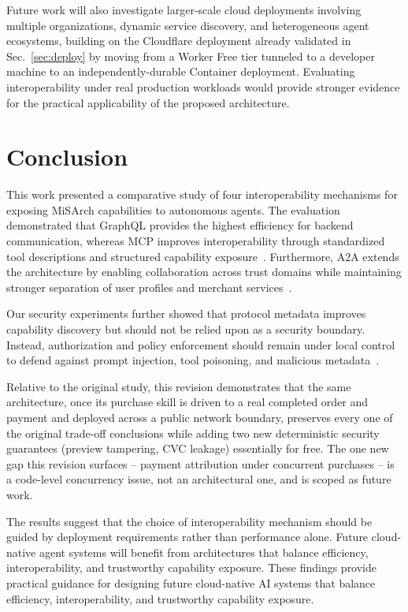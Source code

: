 \documentclass[conference]{IEEEtran}
\begin{document}
Future work will also investigate larger-scale cloud deployments involving
multiple organizations, dynamic service discovery, and heterogeneous agent
ecosystems, building on the Cloudflare deployment already validated in
Sec.~\ref{sec:deploy} by moving from a Worker Free tier tunneled to a
developer machine to an independently-durable Container deployment.
Evaluating interoperability under real production workloads would provide
stronger evidence for the practical applicability of the proposed
architecture.

\section{Conclusion}

This work presented a comparative study of four interoperability mechanisms
for exposing MiSArch capabilities to autonomous agents. The evaluation
demonstrated that GraphQL provides the highest efficiency for backend
communication, whereas MCP improves interoperability through standardized
tool descriptions and structured capability exposure~\cite{ref2,ref9}.
Furthermore, A2A extends the architecture by enabling collaboration across
trust domains while maintaining stronger separation of user profiles and
merchant services~\cite{ref3}.

Our security experiments further showed that protocol metadata improves
capability discovery but should not be relied upon as a security boundary.
Instead, authorization and policy enforcement should remain under local
control to defend against prompt injection, tool poisoning, and malicious
metadata~\cite{ref5,ref6}.

Relative to the original study, this revision demonstrates that the same
architecture, once its purchase skill is driven to a real completed order
and payment and deployed across a public network boundary, preserves every
one of the original trade-off conclusions while adding two new deterministic
security guarantees (preview tampering, CVC leakage) essentially for free.
The one new gap this revision surfaces -- payment attribution under
concurrent purchases -- is a code-level concurrency issue, not an
architectural one, and is scoped as future work.

The results suggest that the choice of interoperability mechanism should be
guided by deployment requirements rather than performance alone. Future
cloud-native agent systems will benefit from architectures that balance
efficiency, interoperability, and trustworthy capability exposure. These
findings provide practical guidance for designing future cloud-native AI
systems that balance efficiency, interoperability, and trustworthy capability
exposure.
\end{document}
